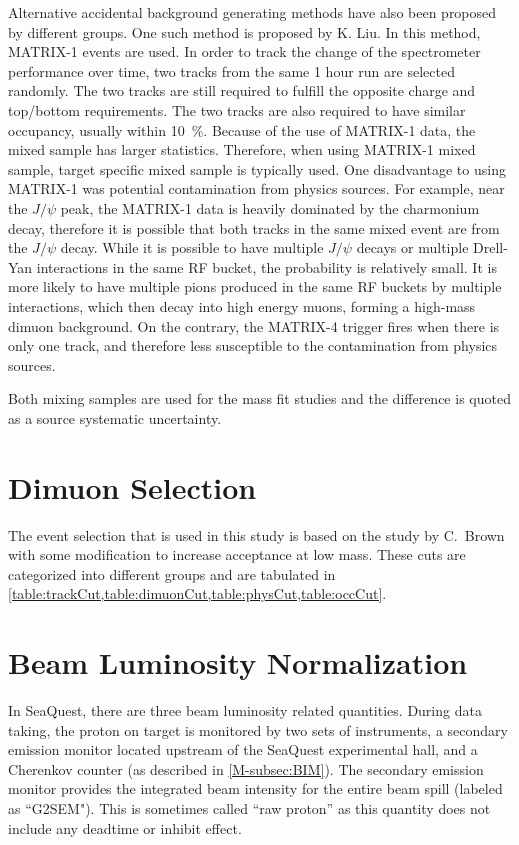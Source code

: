\documentclass[../main.tex]{subfiles}
\begin{document}
Alternative accidental background generating methods have also been proposed by different groups.
One such method is proposed by K. Liu. In this method, MATRIX-1 events are used. In order to track the
change of the spectrometer performance over time, two tracks from the same 1 hour run are selected
randomly. The two tracks are still required to fulfill the opposite charge and top/bottom requirements.
The two tracks are also required to have similar occupancy, usually within \SI{10}{\percent}.
Because of the use of MATRIX-1 data, the mixed sample has larger statistics. Therefore, when
using MATRIX-1 mixed sample, target specific mixed sample is typically used. One disadvantage to using MATRIX-1
was potential contamination from physics sources. For example, near the $J/\psi$ peak, the MATRIX-1
data is heavily dominated by the charmonium decay, therefore it is possible that both tracks in the same
mixed event are from the $J/\psi$ decay. While it is possible to have multiple $J/\psi$ decays or
multiple Drell-Yan interactions in the same RF bucket,
the probability is relatively small. It is more likely to have multiple pions produced in the same RF
buckets by multiple interactions, which then decay into high energy muons, forming a high-mass
dimuon background.
On the contrary, the MATRIX-4 trigger fires when there is only one track, and therefore less
susceptible to the contamination from physics sources.

Both mixing samples are used for the mass fit studies and the difference is quoted as a source systematic
uncertainty.

\section{Dimuon Selection}
The event selection that is used in this study is based on the study by C.~Brown~\cite{chuck-2111}
with some modification to increase acceptance at low mass. These cuts
are categorized into different groups and are tabulated in \cref{table:trackCut,table:dimuonCut,table:physCut,table:occCut}.





\FloatBarrier
\section{Beam Luminosity Normalization}
\label{sec:beam_norm}
In SeaQuest, there are three beam luminosity related quantities.
During data taking, the proton on target is monitored by two sets of instruments, a secondary
emission monitor located upstream of the SeaQuest experimental hall, and a Cherenkov counter
(as described in \cref{M-subsec:BIM}). The secondary emission monitor provides the integrated
beam intensity for the entire beam spill (labeled as ``G2SEM"). This is sometimes called
``raw proton'' as this quantity does not include any deadtime or inhibit effect.
\end{document}
